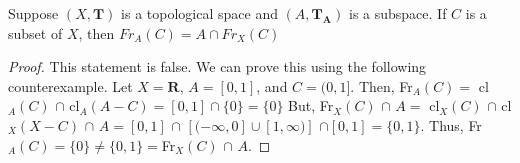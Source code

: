 \setcounter{question}{30}

\begin{question}[Fasano]

Suppose $(X,\mathbf{T})$ is a topological space and $(A,\mathbf{T_A})$ is a subspace. \newline If $C$ is a subset of $X$, then $Fr_A(C)=A\cap Fr_X(C)$

\end{question}

\begin{proof}
    This statement is false. We can prove this using the following counterexample. Let $X=\mathbf{R}$, $A=[0,1]$, and $C=(0,1]$. \newline Then, Fr$_A(C)=$ cl$_A(C)$ $\cap $ cl$_A(A-C)=[0,1]\cap \{0\}=\{0\}$ \newline But, Fr$_X(C)$ $\cap$ $A=$ cl$_X(C)$ $\cap$ cl$_X(X-C)$ $\cap$  $A=[0,1]$ $ \cap$ $[(-\infty,0]\cup [1,\infty)]$ $\cap [0,1]=\{0,1\}$. Thus, \center Fr$_A(C)=\{0\} \neq \{0,1\}=$Fr$_X(C)$ $\cap$ $A$.
\end{proof}

